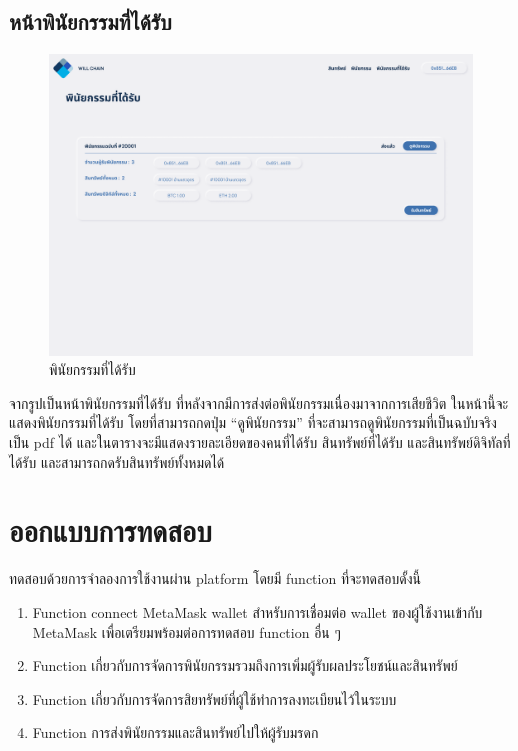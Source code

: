 \documentclass[12pt,oneside,openright,a4paper]{cpe-thai-project}
\begin{document}
\subsection{หน้าพินัยกรรมที่ได้รับ}
		\begin{figure}[!thb]
			\centering
			\includegraphics[scale=0.2]{displayAsset}
			\caption{พินัยกรรมที่ได้รับ}
		\end{figure}
		\FloatBarrier
		\tab จากรูปเป็นหน้าพินัยกรรมที่ได้รับ ที่หลังจากมีการส่งต่อพินัยกรรมเนื่องมาจากการเสียชีวิต ในหน้านี้จะแสดงพินัยกรรมที่ได้รับ โดยที่สามารถกดปุ่ม “ดูพินัยกรรม” ที่จะสามารถดูพินัยกรรมที่เป็นฉบับจริงเป็น pdf ได้ และในตารางจะมีแสดงรายละเอียดของคนที่ได้รับ สินทรัพย์ที่ได้รับ และสินทรัพย์ดิจิทัลที่ได้รับ และสามารถกดรับสินทรัพย์ทั้งหมดได้ 
\section{ออกแบบการทดสอบ}
\tab ทดสอบด้วยการจำลองการใช้งานผ่าน platform โดยมี function ที่จะทดสอบดั้งนี้
	\begin{enumerate}[label=\thesection.\arabic*,leftmargin=0pt,itemindent=1.25cm]
		\item Function connect MetaMask wallet สําหรับการเชื่อมต่อ wallet ของผู้ใช้งานเข้ากับ MetaMask เพื่อเตรียมพร้อมต่อการทดสอบ function อื่น ๆ
		\item Function เกี่ยวกับการจัดการพินัยกรรมรวมถึงการเพิ่มผู้รับผลประโยชน์และสินทรัพย์ 
		\item Function เกี่ยวกับการจัดการสิยทรัพย์ที่ผู้ใช้ทำการลงทะเบียนไว้ในระบบ
		\item Function การส่งพินัยกรรมและสินทรัพย์ไปให้ผู้รับมรดก
	\end{enumerate}
\end{document}
